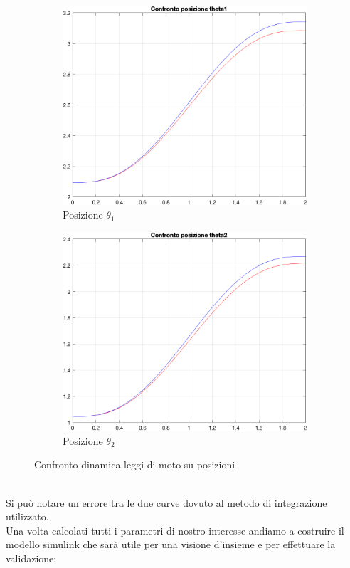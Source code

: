 \begin{figure}[!ht]
\begin{subfigure}{.45\textwidth}
  \centering
  \includegraphics[width=.78\linewidth]{Immagini/Dinamica/confrpost1.png}  
  \caption{Posizione $\theta_1$}
  \label{fig:sub-firsta}
\end{subfigure}
\begin{subfigure}{.45\textwidth}
  \centering
  \includegraphics[width=.78\linewidth]{Immagini/Dinamica/confrpost2.png}  
  \caption{Posizione $\theta_2$}
  \label{fig:sub-seconda}
\end{subfigure}
\caption{Confronto dinamica leggi di moto su posizioni}
\end{figure}
\\Si può notare un errore tra le due curve dovuto al metodo di integrazione utilizzato.
\\Una volta calcolati tutti i parametri di nostro interesse andiamo a costruire il modello simulink che sarà utile per una visione d'insieme e per effettuare la validazione:
